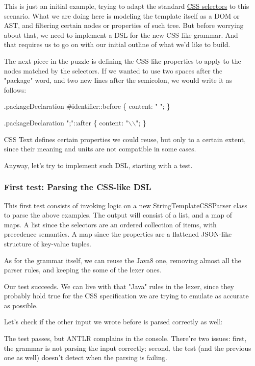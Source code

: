 \documentclass[11pt]{article}
\begin{document}
This is just an initial example, trying to adapt the standard \href{http://www.w3.org/TR/2011/REC-css3-selectors-20110929/}{CSS selectors} to this scenario. What we are doing here is
modeling the template itself as a DOM or AST, and filtering certain nodes or properties of such tree. But before worrying
about that, we need to implement a DSL for the new CSS-like grammar. And that requires us to go on with our initial
outline of what we'd like to build.

The next piece in the puzzle is defining the CSS-like properties to apply to the nodes matched by the selectors.
If we wanted to use two spaces after the "package" word, and two new lines after the semicolon, we would write it as follows:

.packageDeclaration \#identifier::before \{
  content: "  ";
\}

.packageDeclaration ";"::after \{
  content: "$\backslash$\n$\backslash$\n";
\}

CSS Text defines certain properties we could reuse, but only to a certain extent, since their meaning and units are
not compatible in some cases.

Anyway, let's try to implement such DSL, starting with a test.

\subsubsection{First test: Parsing the CSS-like DSL}
\label{sec-1-4-2}

This first test consists of invoking logic on a new StringTemplateCSSParser class to parse the above examples. The output
will consist of a list, and a map of maps. A list since the selectors are an ordered collection of items, with precedence semantics.
A map since the properties are a flattened JSON-like structure of key-value tuples.


As for the grammar itself, we can reuse the Java8 one, removing almost all the parser rules, and keeping the some of the lexer
ones.


Our test succeeds. We can live with that "Java" rules in the lexer, since they probably hold true for the CSS
specification we are trying to emulate as accurate as possible.

Let's check if the other input we wrote before is parsed correctly as well:


The test passes, but ANTLR complains in the console. There're two issues: first, the grammar is not parsing the input correctly; second, the test (and the previous one as well) doesn't
detect when the parsing is failing.
\end{document}
